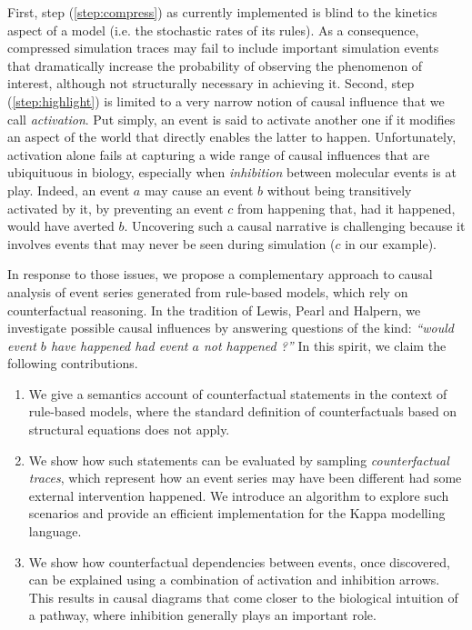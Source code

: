 First, step (\ref{step:compress}) as currently implemented is blind to
the kinetics aspect of a model (i.e. the stochastic rates of its
rules).  As a consequence, compressed simulation traces may fail to
include important simulation events that dramatically increase the
probability of observing the phenomenon of interest, although not
structurally necessary in achieving it. Second, step
(\ref{step:highlight}) is limited to a very narrow notion of causal
influence that we call \emph{activation}. Put simply, an event is said
to activate another one if it modifies an aspect of the world that
directly enables the latter to happen. Unfortunately, activation alone
fails at capturing a wide range of causal influences that are
ubiquituous in biology, especially when \emph{inhibition} between
molecular events is at play.  Indeed, an event $a$ may cause an event
$b$ without being transitively activated by it, by preventing an event
$c$ from happening that, had it happened, would have averted
$b$. Uncovering such a causal narrative is challenging because it
involves events that may never be seen during simulation ($c$ in our
example).

In response to those issues, we propose a complementary approach to
causal analysis of event series generated from rule-based models,
which rely on {counterfactual reasoning}. In the tradition of Lewis,
Pearl and Halpern, we investigate possible causal influences by
answering questions of the kind: \textit{``would event $b$ have
  happened had event $a$ not happened ?''}
In this spirit, we claim the following contributions.
\begin{enumerate}
\item We give a semantics account of counterfactual statements in the
  context of rule-based models, where the standard definition of
  counterfactuals based on structural equations
  \cite{pearl2009causality} does not apply. 
\item We show how such statements can be evaluated by sampling
  \emph{counterfactual traces}, which represent how an event series
  may have been different had some external intervention happened. We
  introduce an algorithm to explore such scenarios and
  provide an efficient implementation for the Kappa modelling
  language.
\item We show how counterfactual dependencies between events, once
  discovered, can be explained using a combination of activation and
  inhibition arrows. This results in causal diagrams that come closer
  to the biological intuition of a pathway, where inhibition generally
  plays an important role.
\end{enumerate}

